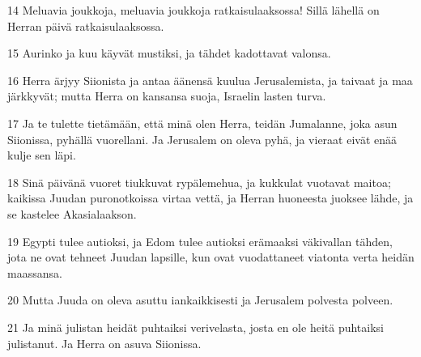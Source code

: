\par 14 Meluavia joukkoja, meluavia joukkoja ratkaisulaaksossa! Sillä lähellä on Herran päivä ratkaisulaaksossa.
\par 15 Aurinko ja kuu käyvät mustiksi, ja tähdet kadottavat valonsa.
\par 16 Herra ärjyy Siionista ja antaa äänensä kuulua Jerusalemista, ja taivaat ja maa järkkyvät; mutta Herra on kansansa suoja, Israelin lasten turva.
\par 17 Ja te tulette tietämään, että minä olen Herra, teidän Jumalanne, joka asun Siionissa, pyhällä vuorellani. Ja Jerusalem on oleva pyhä, ja vieraat eivät enää kulje sen läpi.
\par 18 Sinä päivänä vuoret tiukkuvat rypälemehua, ja kukkulat vuotavat maitoa; kaikissa Juudan puronotkoissa virtaa vettä, ja Herran huoneesta juoksee lähde, ja se kastelee Akasialaakson.
\par 19 Egypti tulee autioksi, ja Edom tulee autioksi erämaaksi väkivallan tähden, jota ne ovat tehneet Juudan lapsille, kun ovat vuodattaneet viatonta verta heidän maassansa.
\par 20 Mutta Juuda on oleva asuttu iankaikkisesti ja Jerusalem polvesta polveen.
\par 21 Ja minä julistan heidät puhtaiksi verivelasta, josta en ole heitä puhtaiksi julistanut. Ja Herra on asuva Siionissa.


